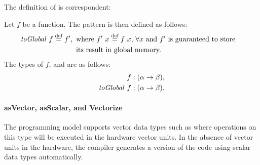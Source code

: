 \noindent
The definition of \toGlobal is correspondent:
\begin{definition}
  \label{definition:pattern:toGlobal}
  Let $f$ be a function.
  The \toGlobal pattern is then defined as follows:
  \begin{align*}
    \text{\textit{toGlobal}}\ f &\stackrel{\textrm{\scriptsize def}}{=} f',
    \begin{aligned}[t]
      &\text{ where $f'\ x \stackrel{\textrm{\scriptsize def}}{=} f\ x$, $\forall x$ and $f'$ is guaranteed to store}\\
      &\text{ its result in global memory.}
    \end{aligned}
  \end{align*}
  The types of $f$, and \toGlobal are as follows:
  \begin{align*}
    f &: (\alpha \rightarrow \beta),\\
    \text{\textit{toGlobal}}\ f &: (\alpha \rightarrow \beta) .
  \end{align*}
\end{definition}





\paragraph{{\footnotesize as}Vector, {\footnotesize as}Scalar, and Vectorize}
The \OpenCL programming model supports vector data types such as  where operations on this type will be executed in the hardware vector units.
In the absence of vector units in the hardware, the \OpenCL compiler generates a version of the code using scalar data types automatically.

